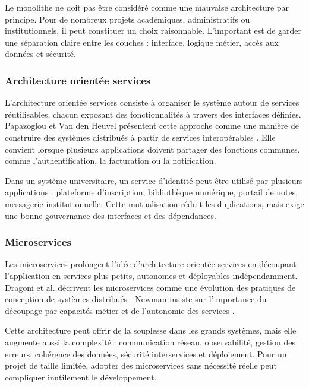 Le monolithe ne doit pas être considéré comme une mauvaise architecture par principe. Pour de nombreux projets académiques, administratifs ou institutionnels, il peut constituer un choix raisonnable. L'important est de garder une séparation claire entre les couches : interface, logique métier, accès aux données et sécurité.

\subsubsection{Architecture orientée services}

L'architecture orientée services consiste à organiser le système autour de services réutilisables, chacun exposant des fonctionnalités à travers des interfaces définies. Papazoglou et Van den Heuvel présentent cette approche comme une manière de construire des systèmes distribués à partir de services interopérables \cite{papazoglou2007service}. Elle convient lorsque plusieurs applications doivent partager des fonctions communes, comme l'authentification, la facturation ou la notification.

Dans un système universitaire, un service d'identité peut être utilisé par plusieurs applications : plateforme d'inscription, bibliothèque numérique, portail de notes, messagerie institutionnelle. Cette mutualisation réduit les duplications, mais exige une bonne gouvernance des interfaces et des dépendances.

\subsubsection{Microservices}

Les microservices prolongent l'idée d'architecture orientée services en découpant l'application en services plus petits, autonomes et déployables indépendamment. Dragoni et al. décrivent les microservices comme une évolution des pratiques de conception de systèmes distribués \cite{dragoni2017microservices}. Newman insiste sur l'importance du découpage par capacités métier et de l'autonomie des services \cite{newman2021building}.

Cette architecture peut offrir de la souplesse dans les grands systèmes, mais elle augmente aussi la complexité : communication réseau, observabilité, gestion des erreurs, cohérence des données, sécurité interservices et déploiement. Pour un projet de taille limitée, adopter des microservices sans nécessité réelle peut compliquer inutilement le développement.

